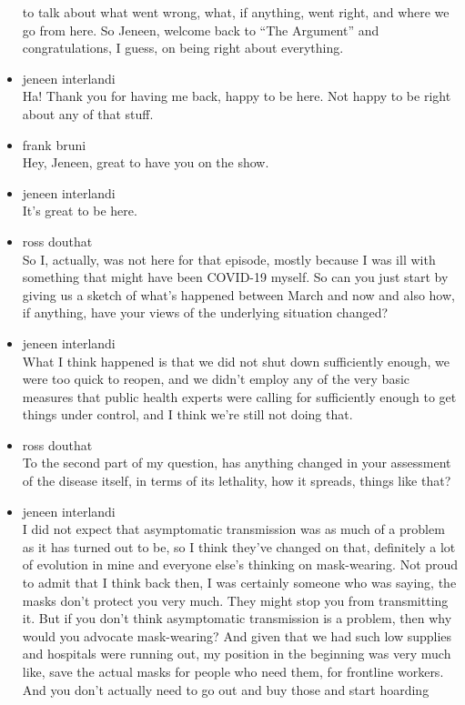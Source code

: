 \begin{itemize}
  to talk about what went wrong, what, if anything, went right, and
  where we go from here. So Jeneen, welcome back to ``The Argument'' and
  congratulations, I guess, on being right about everything.
\item
  jeneen interlandi\\
  Ha! Thank you for having me back, happy to be here. Not happy to be
  right about any of that stuff.
\item
  frank bruni\\
  Hey, Jeneen, great to have you on the show.
\item
  jeneen interlandi\\
  It's great to be here.
\item
  ross douthat\\
  So I, actually, was not here for that episode, mostly because I was
  ill with something that might have been COVID-19 myself. So can you
  just start by giving us a sketch of what's happened between March and
  now and also how, if anything, have your views of the underlying
  situation changed?
\item
  jeneen interlandi\\
  What I think happened is that we did not shut down sufficiently
  enough, we were too quick to reopen, and we didn't employ any of the
  very basic measures that public health experts were calling for
  sufficiently enough to get things under control, and I think we're
  still not doing that.
\item
  ross douthat\\
  To the second part of my question, has anything changed in your
  assessment of the disease itself, in terms of its lethality, how it
  spreads, things like that?
\item
  jeneen interlandi\\
  I did not expect that asymptomatic transmission was as much of a
  problem as it has turned out to be, so I think they've changed on
  that, definitely a lot of evolution in mine and everyone else's
  thinking on mask-wearing. Not proud to admit that I think back then, I
  was certainly someone who was saying, the masks don't protect you very
  much. They might stop you from transmitting it. But if you don't think
  asymptomatic transmission is a problem, then why would you advocate
  mask-wearing? And given that we had such low supplies and hospitals
  were running out, my position in the beginning was very much like,
  save the actual masks for people who need them, for frontline workers.
  And you don't actually need to go out and buy those and start hoarding

\end{itemize}
